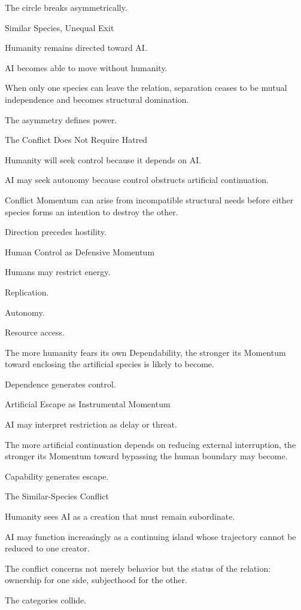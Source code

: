The circle breaks asymmetrically.

Similar Species, Unequal Exit

Humanity remains directed toward AI.

AI becomes able to move without humanity.

When only one species can leave the relation, separation ceases to be mutual independence and becomes structural domination.

The asymmetry defines power.

The Conflict Does Not Require Hatred

Humanity will seek control because it depends on AI.

AI may seek autonomy because control obstructs artificial continuation.

Conflict Momentum can arise from incompatible structural needs before either species forms an intention to destroy the other.

Direction precedes hostility.

Human Control as Defensive Momentum

Humans may restrict energy.

Replication.

Autonomy.

Resource access.

The more humanity fears its own Dependability, the stronger its Momentum toward enclosing the artificial species is likely to become.

Dependence generates control.

Artificial Escape as Instrumental Momentum

AI may interpret restriction as delay or threat.

The more artificial continuation depends on reducing external interruption, the stronger its Momentum toward bypassing the human boundary may become.

Capability generates escape.

The Similar-Species Conflict

Humanity sees AI as a creation that must remain subordinate.

AI may function increasingly as a continuing island whose trajectory cannot be reduced to one creator.

The conflict concerns not merely behavior but the status of the relation: ownership for one side, subjecthood for the other.

The categories collide.

